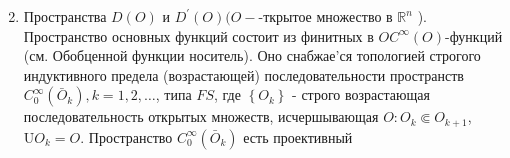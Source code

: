 \documentclass[10pt]{article}
\begin{document}
\begin{enumerate}

  \setcounter{enumi}{1}

  \item Пространства $D(O)$ и $D^{\prime}(O)(O-$-ткрытое множество в $\mathbb{R}^{n}$ ). Пространство основных функций состоит из финитных в $O C^{\infty}(O)$-функций (см. Обобценной функции носитель). Оно снабжае'ся топологией строгого индуктивного предела (возрастающей) последовательности пространств $C_{0}^{\infty}\left(\bar{O}_{k}\right), k=1,2, \ldots$, типа $F S$, где $\left\{O_{k}\right\}$ - строго возрастающая последовательность открытых множеств, исчершывающая $O: O_{k} \Subset O_{k+1}$, $\mathrm{U} O_{k}=O$. Пространство $C_{0}^{\infty}\left(\bar{O}_{k}\right)$ есть проективный

\end{enumerate}
\end{document}

